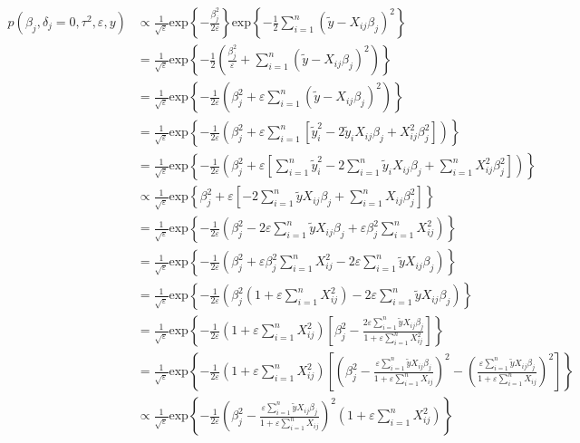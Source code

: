 \documentclass[
]{article}
\begin{document}
\begin{align*}
p(\beta_j, \delta_j=0, \tau^2, \varepsilon, y) &\propto \frac{1}{\sqrt{\varepsilon}}\text{exp}\left\{-\frac{\beta_j^2}{2\varepsilon} \right\} \text{exp}\left\{-\frac{1}{2}\sum_{i=1}^n \left(\tilde{y} - X_{ij}\beta_j \right)^2 \right\} \\
    &=    \frac{1}{\sqrt{\varepsilon}}\text{exp}\left\{-\frac{1}{2} \left(\frac{\beta_j^2}{\varepsilon} + \sum_{i=1}^n \left(\tilde{y} - X_{ij}\beta_j  \right)^2 \right) \right\} \\
    &=    \frac{1}{\sqrt{\varepsilon}}\text{exp}\left\{-\frac{1}{2\varepsilon} \left(\beta_j^2 + \varepsilon \sum_{i=1}^n\left(\tilde{y} - X_{ij}\beta_j \right)^2 \right) \right\} \\
    &=    \frac{1}{\sqrt{\varepsilon}}\text{exp}\left\{-\frac{1}{2\varepsilon} \left(\beta_j^2 + \varepsilon \sum_{i=1}^n \left[\tilde{y}_i^2 - 2\tilde{y}_i X_{ij}\beta_j + X_{ij}^2\beta_j^2 \right] \right) \right\} \\
    &=    \frac{1}{\sqrt{\varepsilon}}\text{exp}\left\{-\frac{1}{2\varepsilon} \left(\beta_j^2 + \varepsilon \left[\sum_{i=1}^n \tilde{y}_i^2 - 2\sum_{i=1}^n\tilde{y}_i X_{ij}\beta_j + \sum_{i=1}^n X_{ij}^2\beta_j^2 \right] \right) \right\} \\
    &\propto    \frac{1}{\sqrt{\varepsilon}}\text{exp}\left\{\beta_j^2 + \varepsilon \left[-2\sum_{i=1}^n\tilde{y}X_{ij}\beta_j+\sum_{i=1}^n X_{ij} \beta_j^2\right] \right\} \\
    &=    \frac{1}{\sqrt{\varepsilon}}\text{exp}\left\{-\frac{1}{2\varepsilon}\left(\beta_j^2 - 2\varepsilon\sum_{i=1}^n\tilde{y}X_{ij}\beta_j + \varepsilon\beta_j^2 \sum_{i=1}^nX_{ij}^2 \right) \right\} \\
    &=    \frac{1}{\sqrt{\varepsilon}}\text{exp}\left\{-\frac{1}{2\varepsilon}\left(\beta_j^2 + \varepsilon\beta_j^2 \sum_{i=1}^nX_{ij}^2- 2\varepsilon\sum_{i=1}^n\tilde{y}X_{ij}\beta_j  \right) \right\} \\
    &=    \frac{1}{\sqrt{\varepsilon}}\text{exp}\left\{-\frac{1}{2\varepsilon}\left(\beta_j^2 \left(1 + \varepsilon\sum_{i=1}^nX_{ij}^2 \right) - 2\varepsilon\sum_{i=1}^n\tilde{y}X_{ij}\beta_j  \right) \right\} \\
    &=    \frac{1}{\sqrt{\varepsilon}}\text{exp}\left\{-\frac{1}{2\varepsilon} \left(1 + \varepsilon \sum_{i=1}^nX_{ij}^2 \right)\left[\beta_j^2- \frac{2\varepsilon\sum_{i=1}^n \tilde{y}X_{ij}\beta_j}{1 + \varepsilon\sum_{i=1}^nX_{ij}^2} \right] \right\} \\
    &=    \frac{1}{\sqrt{\varepsilon}}\text{exp}\left\{-\frac{1}{2\varepsilon} \left(1 + \varepsilon \sum_{i=1}^nX_{ij}^2 \right)\left[\left( \beta_j^2 - \frac{\varepsilon\sum_{i=1}^n\tilde{y}X_{ij}\beta_j}{1+\varepsilon\sum_{i=1}^nX_{ij}}\right)^2 - \left(\frac{\varepsilon\sum_{i=1}^n\tilde{y}X_{ij}\beta_j}{1+\varepsilon\sum_{i=1}^nX_{ij}} \right)^2\right] \right\} \\
    &\propto    \frac{1}{\sqrt{\varepsilon}}\text{exp}\left\{-\frac{1}{2\varepsilon} \left( \beta_j^2 - \frac{\varepsilon\sum_{i=1}^n\tilde{y}X_{ij}\beta_j}{1+\varepsilon\sum_{i=1}^nX_{ij}}\right)^2 \left(1 + \varepsilon \sum_{i=1}^nX_{ij}^2 \right) \right\} 
\end{align*}
\end{document}
